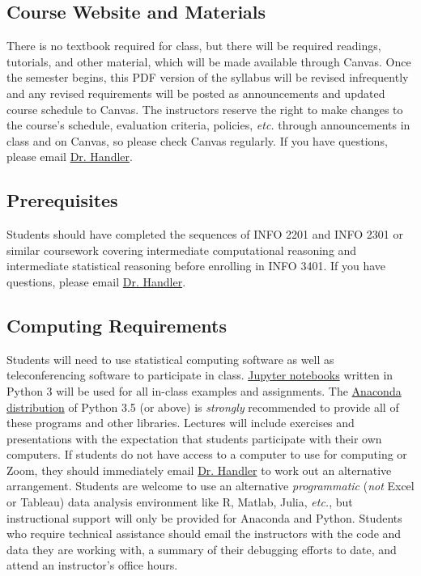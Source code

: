 \documentclass[10pt]{memoir}
\makeatletter
\def\mycourselisting{INFO 3401}
\def\instructorAlastname{Handler}
\def\instructorAemail{abram.handler@colorado.edu}
\makeatother
\begin{document}
\subsection{Course Website and Materials}
There is no textbook required for class, but there will be required readings, tutorials, and other material, which will be made available through Canvas. Once the semester begins, this PDF version of the syllabus will be revised infrequently and any revised requirements will be posted as announcements and updated course schedule to Canvas. The instructors reserve the right to make changes to the course's schedule, evaluation criteria, policies, \textit{etc.} through announcements in class and on Canvas, so please check Canvas regularly. If you have questions, please email \href{mailto:\instructorAemail}{Dr. \instructorAlastname}.



\subsection{Prerequisites}
Students should have completed the sequences of INFO 2201 and INFO 2301 or similar coursework covering intermediate computational reasoning and intermediate statistical reasoning before enrolling in \mycourselisting. If you have questions, please email \href{mailto:\instructorAemail}{Dr. \instructorAlastname}.

\subsection{Computing Requirements}
Students will need to use statistical computing software as well as teleconferencing software to participate in class. \href{http://jupyter.org/}{Jupyter notebooks} written in Python 3 will be used for all in-class examples and assignments. The \href{https://www.continuum.io/why-anaconda}{Anaconda distribution} of Python 3.5 (or above) is \textit{strongly} recommended to provide all of these programs and other libraries. Lectures will include exercises and presentations with the expectation that students participate with their own computers. If students do not have access to a computer to use for computing or Zoom, they should immediately email \href{mailto:\instructorAemail}{Dr. \instructorAlastname} to work out an alternative arrangement. Students are welcome to use an alternative \textit{programmatic} (\textit{not} Excel or Tableau) data analysis environment like R, Matlab, Julia, \textit{etc.}, but instructional support will only be provided for Anaconda and Python. Students who require technical assistance should email the instructors with the code and data they are working with, a summary of their debugging efforts to date, and attend an instructor's office hours.
\end{document}
